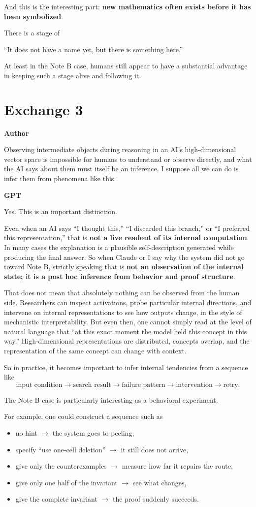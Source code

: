 \documentclass[11pt,a4paper]{article}
\newcommand{\speaker}[1]{\par\medskip\noindent\textsf{\bfseries #1}\par\smallskip}
\begin{document}
And this is the interesting part: \textbf{new mathematics often exists before it has been symbolized}.

There is a stage of

“It does not have a name yet, but there is something here.”

At least in the Note B case, humans still appear to have a substantial advantage in keeping such a stage alive and following it.

\section*{Exchange 3}
\speaker{Author}
Observing intermediate objects during reasoning in an AI's high-dimensional vector space is impossible for humans to understand or observe directly, and what the AI says about them must itself be an inference. I suppose all we can do is infer them from phenomena like this.

\speaker{GPT}
Yes. This is an important distinction.

Even when an AI says “I thought this,” “I discarded this branch,” or “I preferred this representation,” that is \textbf{not a live readout of its internal computation}. In many cases the explanation is a plausible self-description generated while producing the final answer. So when Claude or I say why the system did not go toward Note B, strictly speaking that is \textbf{not an observation of the internal state; it is a post hoc inference from behavior and proof structure}.

That does not mean that absolutely nothing can be observed from the human side. Researchers can inspect activations, probe particular internal directions, and intervene on internal representations to see how outputs change, in the style of mechanistic interpretability. But even then, one cannot simply read at the level of natural language that “at this exact moment the model held this concept in this way.” High-dimensional representations are distributed, concepts overlap, and the representation of the same concept can change with context.

So in practice, it becomes important to infer internal tendencies from a sequence like
\[
\text{input condition}
\to
\text{search result}
\to
\text{failure pattern}
\to
\text{intervention}
\to
\text{retry}.
\]

The Note B case is particularly interesting as a behavioral experiment.

For example, one could construct a sequence such as
\begin{itemize}[leftmargin=2em]
\item no hint $\to$ the system goes to peeling,
\item specify “use one-cell deletion” $\to$ it still does not arrive,
\item give only the counterexamples $\to$ measure how far it repairs the route,
\item give only one half of the invariant $\to$ see what changes,
\item give the complete invariant $\to$ the proof suddenly succeeds.
\end{itemize}
\end{document}
